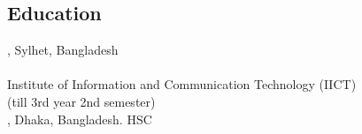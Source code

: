 \documentclass[mm]{simple_style}
\begin{document}
\begin{resume}
\vspace{-3mm}
\section{Education}
, Sylhet, Bangladesh\\
 \\ Institute of Information and Communication Technology (IICT)  \\
\vspace{2mm}
 (till 3rd year 2nd semester)\\
, Dhaka, Bangladesh. 
HSC
 \hspace\\
\vspace{-3ex}
\sectionline
\vspace{-3mm}

\end{resume}
\end{document}
